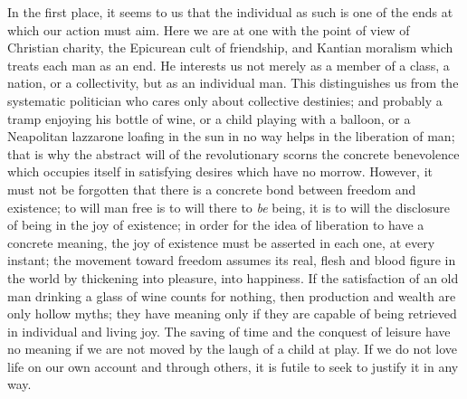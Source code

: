 \documentclass[11pt]{article}
\begin{document}
{{In the first place, it seems to us that the individual as such is one of the ends at which our action must aim. Here we are at one with the point of view of Christian charity, the Epicurean cult of friendship, and Kantian moralism which treats each man as an end. He interests us not merely as a member of a class, a nation, or a collectivity, but as an individual man. This distinguishes us from the systematic politician who cares only about collective destinies; and probably a tramp enjoying his bottle of wine, or a child playing with a balloon, or a Neapolitan lazzarone loafing in the sun in no way helps in the liberation of man; that is why the abstract will of the revolutionary scorns the concrete benevolence which occupies itself in satisfying desires which have no morrow. However, it must not be forgotten that there is a concrete bond between freedom and existence; to will man free is to will there to \textit{be} being, it is to will the disclosure of being in the joy of existence; in order for the idea of liberation to have a concrete meaning, the joy of existence must be asserted in each one, at every instant; the movement toward freedom assumes its real, flesh and blood figure in the world by thickening into pleasure, into happiness. If the satisfaction of an old man drinking a glass of wine counts for nothing, then production and wealth are only hollow myths; they have meaning only if they are capable of being retrieved in individual and living joy. The saving of time and the conquest of leisure have no meaning if we are not moved by the laugh of a child at play. If we do not love life on our own account and through others, it is futile to seek to justify it in any way.

}}
\end{document}
